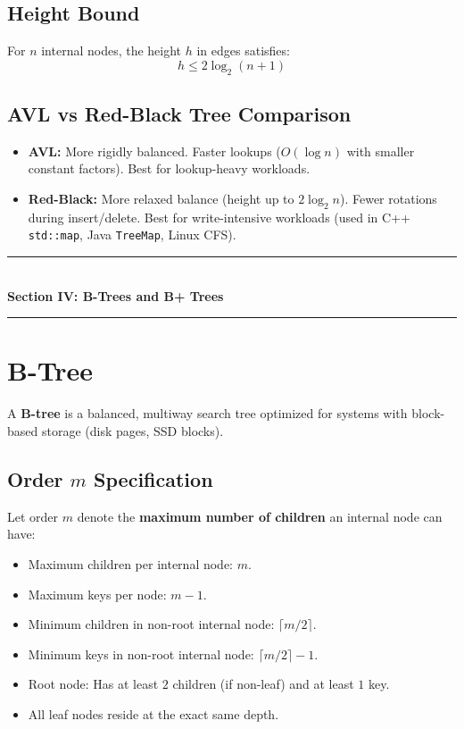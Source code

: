 \subsection{Height Bound}
For $n$ internal nodes, the height $h$ in edges satisfies:
\[
\boxed{h \leq 2 \log_2(n + 1)}
\]

\subsection{AVL vs Red-Black Tree Comparison}
\begin{itemize}
    \item \textbf{AVL:} More rigidly balanced. Faster lookups ($O(\log n)$ with smaller constant factors). Best for lookup-heavy workloads.
    \item \textbf{Red-Black:} More relaxed balance (height up to $2 \log_2 n$). Fewer rotations during insert/delete. Best for write-intensive workloads (used in C++ \texttt{std::map}, Java \texttt{TreeMap}, Linux CFS).
\end{itemize}

\begin{center}
\vspace{1em}
{\color{primary}\rule{0.45\textwidth}{1.2pt}}\\[4pt]
{\Large\bfseries\color{primary} Section IV: B-Trees and B+ Trees}\\[2pt]
{\color{primary}\rule{0.45\textwidth}{1.2pt}}
\vspace{0.5em}
\end{center}

\section{B-Tree}

A \textbf{B-tree} is a balanced, multiway search tree optimized for systems with block-based storage (disk pages, SSD blocks).

\subsection{Order $m$ Specification}
Let order $m$ denote the \textbf{maximum number of children} an internal node can have:
\begin{itemize}
    \item Maximum children per internal node: $m$.
    \item Maximum keys per node: $m - 1$.
    \item Minimum children in non-root internal node: $\lceil m/2 \rceil$.
    \item Minimum keys in non-root internal node: $\lceil m/2 \rceil - 1$.
    \item Root node: Has at least $2$ children (if non-leaf) and at least $1$ key.
    \item All leaf nodes reside at the exact same depth.
\end{itemize}


